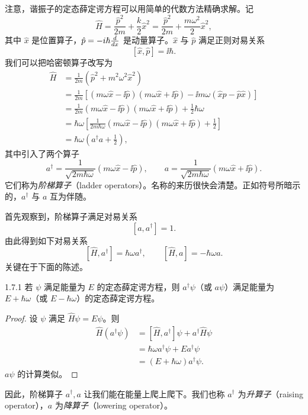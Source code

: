 注意，谐振子的定态薛定谔方程可以用简单的代数方法精确求解。记
\[
\hat H=\frac{\hat p^2}{2m}+\frac{k}{2}\hat x^2
=\frac{\hat p^2}{2m}+\frac{m\omega^2}{2}\hat x^2,
\]
其中 $\hat x$ 是位置算子，$\hat p=-i\hbar\frac{d}{d x}$ 是动量算子。$\hat x$ 与 $\hat p$ 满足正则对易关系
\[
[\hat x,\hat p]=\ii\hbar.
\]
我们可以把哈密顿算子改写为
\[
\begin{aligned}
\hat H&=\frac{1}{2m}\left(\hat p^2+m^2\omega^2\hat x^2\right)\\
&=\frac{1}{2m}\left[(m\omega\hat x-\ii\hat p)(m\omega\hat x+\ii\hat p)-\ii m\omega(\hat x\hat p-\hat p\hat x)\right]\\
&=\frac{1}{2m}(m\omega\hat x-\ii\hat p)(m\omega\hat x+\ii\hat p)+\frac12\hbar\omega\\
&=\hbar\omega\left[\frac{1}{2m\hbar\omega}(m\omega\hat x-\ii\hat p)(m\omega\hat x+\ii\hat p)+\frac12\right]\\
&=\hbar\omega\left(a^\dagger a+\frac12\right),
\end{aligned}
\]
其中引入了两个算子
\[
a^\dagger=\frac{1}{\sqrt{2m\hbar\omega}}(m\omega\hat x-\ii\hat p),
\qquad
a=\frac{1}{\sqrt{2m\hbar\omega}}(m\omega\hat x+\ii\hat p).
\]
它们称为\emph{阶梯算子}（ladder operators）。名称的来历很快会清楚。正如符号所暗示的，$a^\dagger$ 与 $a$ 互为伴随。

首先观察到，阶梯算子满足对易关系
\[
[a,a^\dagger]=1.
\]
由此得到如下对易关系
\[
[\hat H,a^\dagger]=\hbar\omega a^\dagger,
\qquad
[\hat H,a]=-\hbar\omega a.
\]
关键在于下面的陈述。

\begin{proposition}{1.7.1}
  若 $\psi$ 满足能量为 $E$ 的定态薛定谔方程，则 $a^\dagger\psi$（或 $a\psi$）满足能量为 $E+\hbar\omega$（或 $E-\hbar\omega$）的定态薛定谔方程。
\end{proposition}

\begin{proof}
  设 $\psi$ 满足 $\hat H\psi=E\psi$。则
  \[
  \begin{aligned}
  \hat H\left(a^\dagger\psi\right)
  &=[\hat H,a^\dagger]\psi+a^\dagger\hat H\psi\\
  &=\hbar\omega a^\dagger\psi+Ea^\dagger\psi\\
  &=(E+\hbar\omega)a^\dagger\psi.
  \end{aligned}
  \]
  $a\psi$ 的计算类似。
\end{proof}

因此，阶梯算子 $a^\dagger,a$ 让我们能在能量上爬上爬下。我们也称 $a^\dagger$ 为\emph{升算子}（raising operator），$a$ 为\emph{降算子}（lowering operator）。

